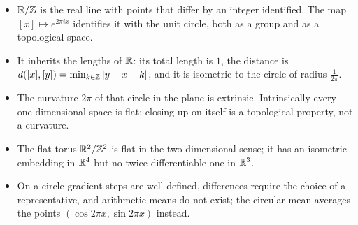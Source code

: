 \begin{notechapter}
\begin{chaptersummary}
\begin{itemize}
  \item $\mathbb{R}/\mathbb{Z}$ is the real line with points that differ by an integer identified. The map $[x]\mapsto e^{2\pi ix}$
        identifies it with the unit circle, both as a group and as a topological space.
  \item It inherits the lengths of $\mathbb{R}$: its total length is $1$, the distance is
        $d([x], [y]) = \min_{k\in\mathbb{Z}}\left|y - x - k\right|$, and it is isometric to the circle of radius $\frac1{2\pi}$.
  \item The curvature $2\pi$ of that circle in the plane is extrinsic. Intrinsically every
        one-dimensional space is flat; closing up on itself is a topological property, not a curvature.
  \item The flat torus $\mathbb{R}^2/\mathbb{Z}^2$ is flat in the two-dimensional sense; it has an isometric embedding in
        $\mathbb{R}^4$ but no twice differentiable one in $\mathbb{R}^3$.
  \item On a circle gradient steps are well defined, differences require the choice of a
        representative, and arithmetic means do not exist; the circular mean averages the points
        $(\cos2\pi x, \sin2\pi x)$ instead.
\end{itemize}
\end{chaptersummary}
\end{notechapter}
